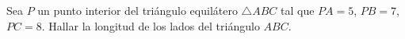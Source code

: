 Sea $P$ un punto interior del triángulo equilátero $\triangle ABC$ tal que $PA = 5$, $PB = 7$, $PC = 8$. Hallar la longitud de los lados del triángulo $ABC$.
